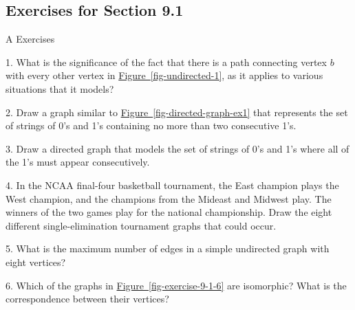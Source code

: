 \documentclass[10pt,]{book}
\theoremstyle{plain}
\theoremstyle{definition}
\theoremstyle{definition}
\theoremstyle{definition}
\theoremstyle{definition}
\theoremstyle{definition}
\numberwithin{equation}{section}
\begin{document}
\subsection[Exercises for Section 9.1]{Exercises for Section 9.1}\label{exercises-9-1}
\hypertarget{exercisegroup-1}{}\typeout{************************************************}
\typeout{************************************************}
A Exercises%
\begin{exercisegroup}
\item[1.]\hypertarget{exercise-1}{} What is the significance of the fact that there is a path connecting vertex \(b\) with every other vertex in \hyperref[fig-undirected-1]{Figure~\ref{fig-undirected-1}}, as it applies to various situations that it models?%
\par\smallskip
\item[2.]\hypertarget{exercise-2}{} Draw a graph similar to \hyperref[fig-directed-graph-ex1]{Figure~\ref{fig-directed-graph-ex1}} that represents the set of strings of 0's and 1's containing no more than two consecutive 1's.%
\par\smallskip
\item[3.]\hypertarget{exercise-3}{} Draw a directed graph that models the set of strings of 0's and 1's where all of the 1's must appear consecutively. %
\par\smallskip
\item[4.]\hypertarget{exercise-4}{} In the NCAA final-four basketball tournament, the East champion plays the West champion, and the champions from the Mideast and Midwest play. The winners of the two games play for the national championship. Draw the eight different single-elimination tournament graphs that could occur.%
\par\smallskip
\item[5.]\hypertarget{exercise-5}{} What is the maximum number of edges in a simple undirected graph with eight vertices?%
\par\smallskip
\item[6.]\hypertarget{exercise-6}{} Which of the graphs in \hyperref[fig-exercise-9-1-6]{Figure~\ref{fig-exercise-9-1-6}} are isomorphic? What is the correspondence between their vertices?%
\leavevmode%
\begin{figure}
\centering

\end{figure}
\end{exercisegroup}
\end{document}
